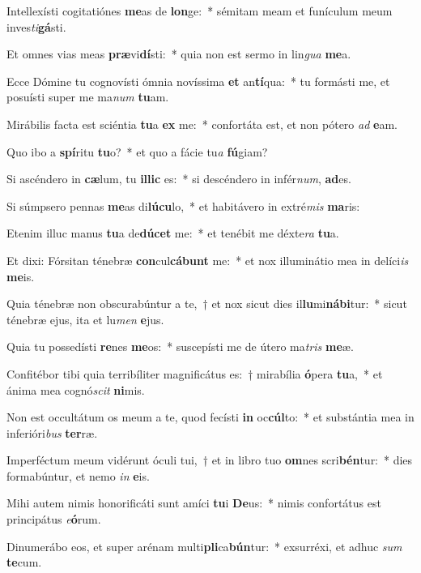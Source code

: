 \item Intellexísti cogitatiónes \textbf{me}as de \textbf{lon}ge:~* sémitam meam et funículum meum inves\textit{ti}\textbf{gá}sti.
\item Et omnes vias meas \textbf{præ}vi\textbf{dí}sti:~* quia non est sermo in lin\textit{gua} \textbf{me}a.
\item Ecce Dómine tu cognovísti ómnia novíssima \textbf{et} an\textbf{tí}qua:~* tu formásti me, et posuísti super me ma\textit{num} \textbf{tu}am.
\item Mirábilis facta est sciéntia \textbf{tu}a \textbf{ex} me:~* confortáta est, et non pótero \textit{ad} \textbf{e}am.
\item Quo ibo a \textbf{spí}ritu \textbf{tu}o?~* et quo a fácie tu\textit{a} \textbf{fú}giam?
\item Si ascéndero in \textbf{cæ}lum, tu \textbf{il}\textbf{lic} es:~* si descéndero in infér\textit{num}, \textbf{ad}es.
\item Si súmpsero pennas \textbf{me}as di\textbf{lú}\textbf{cu}lo,~* et habitávero in extré\textit{mis} \textbf{ma}ris:
\item Etenim illuc manus \textbf{tu}a de\textbf{dú}\textbf{cet} me:~* et tenébit me déxte\textit{ra} \textbf{tu}a.
\item Et dixi: Fórsitan ténebræ \textbf{con}cul\textbf{cá}\textbf{bunt} me:~* et nox illuminátio mea in delíci\textit{is} \textbf{me}is.
\item Quia ténebræ non obscurabúntur a te,~† et nox sicut dies il\textbf{lu}mi\textbf{ná}\textbf{bi}tur:~* sicut ténebræ ejus, ita et lu\textit{men} \textbf{e}jus.
\item Quia tu possedísti \textbf{re}nes \textbf{me}os:~* suscepísti me de útero ma\textit{tris} \textbf{me}æ.
\item Confitébor tibi quia terribíliter magnificátus es:~† mirabília \textbf{ó}pera \textbf{tu}a,~* et ánima mea cognó\textit{scit} \textbf{ni}mis.
\item Non est occultátum os meum a te, quod fecísti \textbf{in} oc\textbf{cúl}to:~* et substántia mea in inferióri\textit{bus} \textbf{ter}ræ.
\item Imperféctum meum vidérunt óculi tui,~† et in libro tuo \textbf{om}nes scri\textbf{bén}tur:~* dies formabúntur, et nemo \textit{in} \textbf{e}is.
\item Mihi autem nimis honorificáti sunt amíci \textbf{tu}i \textbf{De}us:~* nimis confortátus est principátus \textit{e}\textbf{ó}rum.
\item Dinumerábo eos, et super arénam multi\textbf{pli}ca\textbf{bún}tur:~* exsurréxi, et adhuc \textit{sum} \textbf{te}cum.
